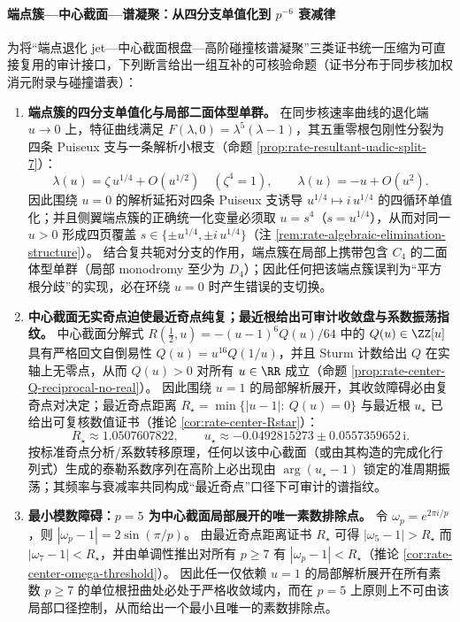 \paragraph{端点簇—中心截面—谱凝聚：从四分支单值化到 \texorpdfstring{$p^{-6}$}{p^-6} 衰减律}
为将“端点退化 jet—中心截面根盘—高阶碰撞核谱凝聚”三类证书统一压缩为可直接复用的审计接口，下列断言给出一组互补的可核验命题（证书分布于同步核加权消元附录与碰撞谱表）：
\begin{enumerate}
  \item \textbf{端点簇的四分支单值化与局部二面体型单群。}
  在同步核速率曲线的退化端 \(u\to 0\) 上，特征曲线满足 \(F(\lambda,0)=\lambda^5(\lambda-1)\)，其五重零根包刚性分裂为四条 Puiseux 支与一条解析小根支（命题 \ref{prop:rate-resultant-uadic-split-7}）：
  \[
  \lambda(u)=\zeta\,u^{1/4}+O(u^{1/2})\quad(\zeta^4=1),
  \qquad
  \lambda(u)=-u+O(u^2).
  \]
  因此围绕 \(u=0\) 的解析延拓对四条 Puiseux 支诱导 \(u^{1/4}\mapsto i\,u^{1/4}\) 的四循环单值化；并且侧翼端点簇的正确统一化变量必须取 \(u=s^4\)（\(s=u^{1/4}\)），从而对同一 \(u>0\) 形成四页覆盖 \(s\in\{\pm u^{1/4},\pm i\,u^{1/4}\}\)（注 \ref{rem:rate-algebraic-elimination-structure}）。
  结合复共轭对分支的作用，端点簇在局部上携带包含 \(C_4\) 的二面体型单群（局部 monodromy 至少为 \(D_4\)）；因此任何把该端点簇误判为“平方根分歧”的实现，必在环绕 \(u=0\) 时产生错误的支切换。

  \item \textbf{中心截面无实奇点迫使最近奇点纯复；最近根给出可审计收敛盘与系数振荡指纹。}
  中心截面分解式 \(R(\tfrac12,u)=-(u-1)^6Q(u)/64\) 中的 \(Q(u)\in\ZZ[u]\) 具有严格回文自倒易性 \(Q(u)=u^{16}Q(1/u)\)，并且 Sturm 计数给出 \(Q\) 在实轴上无零点，从而 \(Q(u)>0\) 对所有 \(u\in\RR\) 成立（命题 \ref{prop:rate-center-Q-reciprocal-no-real}）。
  因此围绕 \(u=1\) 的局部解析展开，其收敛障碍必由复奇点对决定；最近奇点距离
  \(
  R_\star=\min\{|u-1|:\ Q(u)=0\}
  \)
  与最近根 \(u_\star\) 已给出可复核数值证书（推论 \ref{cor:rate-center-Rstar}）：
  \[
  R_\star\approx 1.0507607822,
  \qquad
  u_\star\approx -0.0492815273\pm 0.0557359652\,\mathrm{i}.
  \]
  按标准奇点分析/系数转移原理，任何以该中心截面（或由其构造的完成化行列式）生成的泰勒系数序列在高阶上必出现由 \(\arg(u_\star-1)\) 锁定的准周期振荡；其频率与衰减率共同构成“最近奇点”口径下可审计的谱指纹。

  \item \textbf{最小模数障碍：\texorpdfstring{$p=5$}{p=5} 为中心截面局部展开的唯一素数排除点。}
  令 \(\omega_p=e^{2\pi i/p}\)，则 \(|\omega_p-1|=2\sin(\pi/p)\)。
  由最近奇点距离证书 \(R_\star\) 可得
  \(
  |\omega_5-1|>R_\star
  \)
  而
  \(
  |\omega_7-1|<R_\star
  \)，并由单调性推出对所有 \(p\ge 7\) 有 \(|\omega_p-1|<R_\star\)（推论 \ref{cor:rate-center-omega-threshold}）。
  因此任一仅依赖 \(u=1\) 的局部解析展开在所有素数 \(p\ge 7\) 的单位根扭曲处必处于严格收敛域内，而在 \(p=5\) 上原则上不可由该局部口径控制，从而给出一个最小且唯一的素数排除点。


\end{enumerate}
